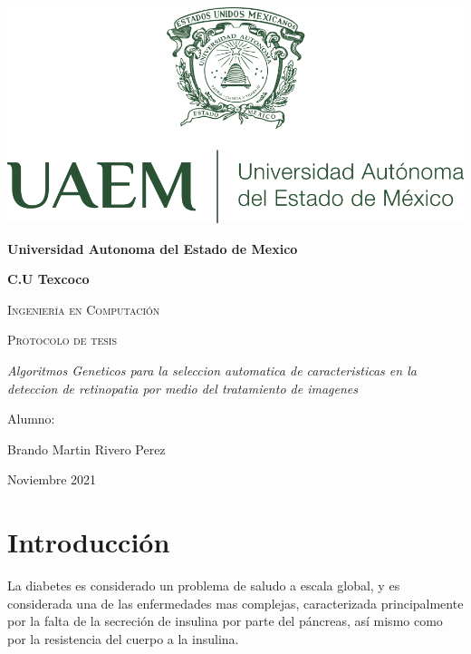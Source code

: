 \documentclass[12pt,letterpaper]{article}
\author{Sergio de Jesús Hernández Sánchez; Brando Martín Rivero Pérez}
\begin{document}
	\begin{titlepage}
		\pagestyle{empty}
		\centering
		\includegraphics[scale=.25]{IMAGENES/LOGO_UAEMEX.png}\\
		{\bfseries\LARGE Universidad Autonoma del Estado de Mexico\par}
		\vspace{1cm}
		{\bfseries\LARGE C.U Texcoco\par}
		\vspace{1cm}
		{\scshape\Large Ingeniería en Computación \par}
		\vspace{3cm}
		{\scshape\Huge Protocolo de tesis\par}
		\vspace{3cm}
		{\itshape\Large Algoritmos Geneticos para la seleccion automatica de caracteristicas en la deteccion de retinopatia por medio del tratamiento de imagenes  \par}
		\vfill
		{\Large Alumno: \par}
		{\Large Brando Martin Rivero Perez\par}
		\vfill
		{\Large Noviembre 2021 \par}
	\end{titlepage}
	\newpage
	\pagestyle{empty}
	\tableofcontents
	\listoffigures
	\listoftables
	\newpage
	\setcounter{page}{1}
	\pagestyle{plain}
	

\section{Introducción}

\bigskip

La diabetes es considerado un problema de saludo a escala global, y es considerada una de las enfermedades mas complejas, caracterizada principalmente por la falta de la secreción de  insulina por parte del páncreas, así mismo como por la resistencia del cuerpo a la insulina.
\end{document}
